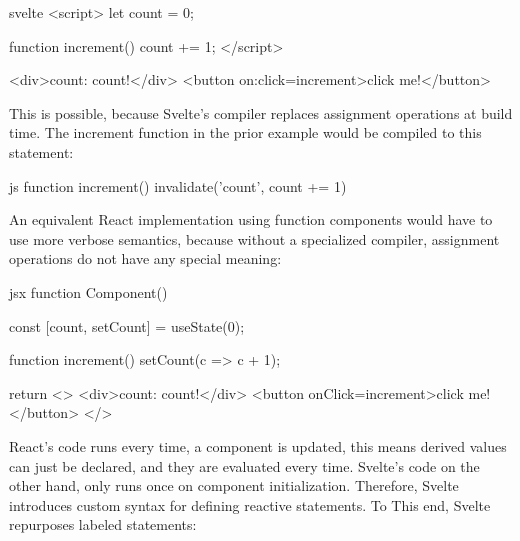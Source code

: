 \begin{myminted}{svelte}{}
<script>
    let count = 0;

    function increment() {
        count += 1;
    }
</script>

<div>count: {count}!</div>
<button on:click={increment}>click me!</button>
\end{myminted}

This is possible, because Svelte's compiler replaces assignment operations at build time. The increment function in the prior example would be compiled to this statement:

\begin{myminted}{js}{}
function increment() {
    $$invalidate('count', count += 1)
}
\end{myminted}
\s{$$}

An equivalent React implementation using function components would have to use more verbose semantics, because without a specialized compiler, assignment operations do not have any special meaning:

\begin{myminted}{jsx}{}
function Component() {
    const [count, setCount] = useState(0);

    function increment() {
        setCount(c => c + 1);
    }

    return <>
        <div>count: {count}!</div>
        <button onClick={increment}>click me!</button>
    </>
}
\end{myminted}

React's code runs every time, a component is updated, this means derived values can just be declared, and they are evaluated every time. Svelte's code on the other hand, only runs once on component initialization. Therefore, Svelte introduces custom syntax for defining reactive statements. To This end, Svelte repurposes labeled statements:


\s{$}


